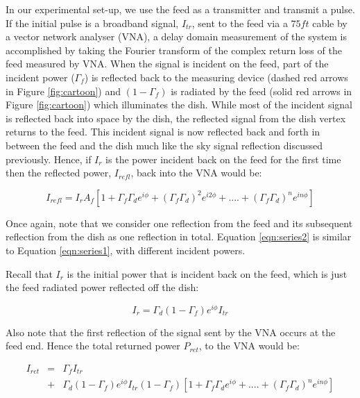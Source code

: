 \documentclass[12pt,preprint]{aastex}
\begin{document}
In our experimental set-up, we use the feed as a transmitter and transmit a pulse. If the initial pulse is a broadband signal,
$I_{tr}$, sent to the feed via a $75ft$ cable by a vector network
analyser (VNA), a delay domain measurement of the system is accomplished by
taking the Fourier transform of the complex return loss of the feed measured by VNA. When the signal is incident on
the feed, part of the incident power ($\Gamma_{f}$) is reflected back to the
measuring device (dashed red arrows in Figure \ref{fig:cartoon}) and
$(1-\Gamma_{f})$ is radiated by the feed (solid red arrows in Figure
\ref{fig:cartoon}) which illuminates the dish. While most of the incident signal is reflected back into space by the dish, the reflected signal from the dish vertex returns to
the feed. This incident signal is now
reflected back and forth in between the feed and the dish much like the sky
signal reflection discussed previously.  Hence, if $I_{r}$ is the power
incident back on the feed for the first time then the reflected power, $I_{refl}$,
back into the VNA would be:

\begin{equation}\label{eqn:series2}
I_{refl} =  I_{r}A_{f}[1+ \Gamma_{f}\Gamma_{d} e^{i\phi}+ (\Gamma_{f}\Gamma_{d})^2e^{i2\phi}+ ....+ (\Gamma_{f}\Gamma_{d})^{n}e^{in\phi}]
\end{equation}
 
Once again, note that we consider one reflection from the feed and its subsequent reflection from the dish as one reflection in total. Equation \ref{eqn:series2} is similar to Equation \ref{eqn:series1}, with different incident powers.

Recall that $I_{r}$ is the initial power that is incident back on the feed, which is just the feed radiated power reflected off the dish:
 
\begin{equation}
I_{r}= \Gamma_{d}(1-\Gamma_f)e^{i\phi} I_{tr}
\end{equation}

Also note that the first reflection of the signal sent by the VNA occurs at the feed end. Hence the total returned power $P_{ret}$, to the VNA  would be:

\begin{eqnarray}
I_{ret} & = & \Gamma_{f}I_{tr} \nonumber\\ 
 & + &   \Gamma_{d}(1-\Gamma_f)e^{i\phi} I_{tr}(1-\Gamma_{f}) [1+ \Gamma_{f}\Gamma_{d} e^{i\phi}+  ....+ (\Gamma_{f}\Gamma_{d})^{n}e^{in\phi}]\nonumber\\
 \end{eqnarray}
 
\end{document}
